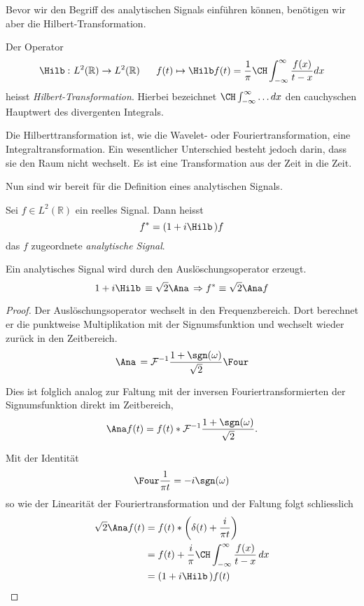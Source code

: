 Bevor wir den Begriff des analytischen Signals einführen können, benötigen wir aber die Hilbert-Transformation.
\begin{definition}
	Der Operator
 	\[
 	\Hilb\,\colon L^2(\mathbb R) \to L^2(\mathbb R)
 	~\quad~
 	f(t) \mapsto \Hilb f(t)
 	= \frac{1}{\pi} \CH\int_{-\infty}^{\infty}\frac{f(x)}{t-x} dx
 	\]
 	heisst \emph{Hilbert-Transformation}.
 	Hierbei bezeichnet $\CH\int_{-\infty}^{\infty} \dots dx$ den cauchyschen Hauptwert des divergenten Integrals.
%
%
\end{definition}

Die Hilberttransformation ist, wie die Wavelet- oder Fouriertransformation, eine Integraltransformation.
Ein wesentlicher Unterschied besteht jedoch darin, dass sie den Raum nicht wechselt.
Es ist eine Transformation aus der Zeit in die Zeit.

Nun sind wir bereit für die Definition eines analytischen Signals.
\begin{definition}
	\label{complex:analytic-signal}
	Sei $f \in L^2(\mathbb R)$ ein reelles Signal.
	Dann heisst
	\[f^\ast = (1 + i\Hilb\,)f \]
	das $f$ zugeordnete \emph{analytische Signal}.
\end{definition}
\begin{satz}
	Ein analytisches Signal wird durch den Auslöschungsoperator erzeugt.
	\[1 + i\Hilb\, \equiv \sqrt 2 \Ana\, \Rightarrow f^\ast \equiv \sqrt 2 \Ana f\]
\end{satz}

\begin{proof}
	Der Auslöschungsoperator wechselt in den Frequenzbereich.
	Dort berechnet er die punktweise Multiplikation mit der Signumsfunktion und wechselt wieder zurück in den Zeitbereich.
	\[\Ana\, = \mathcal{F}^{-1}\frac{1+\sgn(\omega)}{\sqrt 2}\Four\]
	
	Dies ist folglich analog zur Faltung mit der inversen Fouriertransformierten der Signumsfunktion direkt im Zeitbereich,
	\[ \Ana f(t) = f(t) * \mathcal{F}^{-1}\frac{1 + \sgn(\omega)}{\sqrt 2}. \]
	
	Mit der Identität
	\[\Four\frac{1}{\pi t} = -i\sgn(\omega)\]
	so wie der Linearität der Fouriertransformation und der Faltung folgt schliesslich
	\begin{align*}
		\sqrt 2 \Ana f(t) 
		&= f(t) * \biggl(\delta(t) + \frac{i}{\pi t} \biggr)\\
		&= f(t) + \frac{i}{\pi} \CH\int_{-\infty}^{\infty} \frac{f(x)}{t - x} \,dx\\
		&= (1 + i\Hilb\,) f(t)\qedhere
	\end{align*}
\end{proof}

